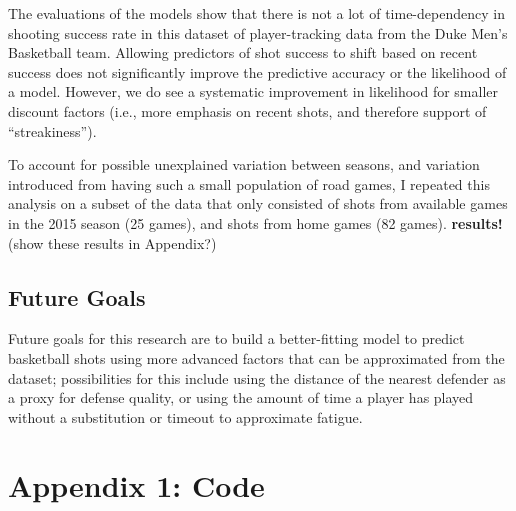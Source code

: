 \documentclass[12pt,twoside]{dukestatscithesis}
\theoremstyle{definition}
\theoremstyle{definition}
\theoremstyle{definition}
\theoremstyle{remark}
\begin{document}
The evaluations of the models show that there is not a lot of
time-dependency in shooting success rate in this dataset of
player-tracking data from the Duke Men's Basketball team. Allowing
predictors of shot success to shift based on recent success does not
significantly improve the predictive accuracy or the likelihood of a
model. However, we do see a systematic improvement in likelihood for
smaller discount factors (i.e., more emphasis on recent shots, and
therefore support of ``streakiness'').

To account for possible unexplained variation between seasons, and
variation introduced from having such a small population of road games,
I repeated this analysis on a subset of the data that only consisted of
shots from available games in the 2015 season (25 games), and shots from
home games (82 games). \textbf{results!} (show these results in
Appendix?)

\section{Future Goals}\label{future-goals}

Future goals for this research are to build a better-fitting model to
predict basketball shots using more advanced factors that can be
approximated from the dataset; possibilities for this include using the
distance of the nearest defender as a proxy for defense quality, or
using the amount of time a player has played without a substitution or
timeout to approximate fatigue.

\appendix

\chapter{Appendix 1: Code}\label{appendix-1-code}
\end{document}

